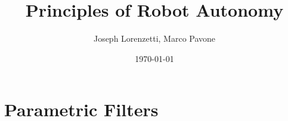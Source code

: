 \documentclass[nohyper,nobib]{tufte-book}
\title{Principles of Robot Autonomy}
\author{Joseph Lorenzetti, Marco Pavone}
\date{\today}
\begin{document}
\chapter{Parametric Filters}


\printbibliography
\end{document}
